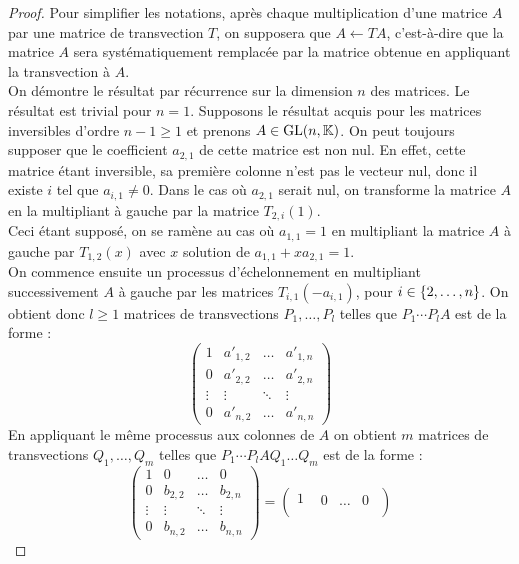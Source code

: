 \begin{proof}
Pour simplifier les notations, après chaque multiplication d'une matrice $A$ par une matrice de transvection $T$, on supposera que 
$A \longleftarrow T A$, 
c'est-à-dire que la matrice $A$ sera systématiquement remplacée par la matrice obtenue en appliquant la transvection à $A$. \\
 
On démontre le résultat par récurrence sur la dimension $n$ des matrices.
Le résultat est trivial pour $n=1$. Supposons le résultat acquis pour les matrices inversibles d'ordre $n-1 \geq 1$ et prenons $A \in \text{GL}(n,\mathbb{K})$.
On peut toujours supposer que le coefficient $a_{2,1}$ de cette matrice est non nul. En effet, cette matrice étant inversible, sa première
colonne n'est pas le vecteur nul, donc il existe $i$ tel que $a_{i,1} \neq 0$. 
Dans le cas où $a_{2,1}$ serait nul, on transforme la matrice $A$ en la multipliant à gauche par la matrice $T_{2,i}(1)$. \\
Ceci étant supposé, on se ramène au cas où $a_{1,1} = 1$ en multipliant la matrice $A$  à gauche par $T_{1,2}(x)$ 
avec $x$ solution de $a_{1,1} + x a_{2,1} = 1$. \\ 
On commence ensuite un processus d'échelonnement en multipliant successivement $A$ à gauche par les matrices $T_{i,1}(-a_{i,1})$,
pour $i \in \{ 2, \dots, n \}$.
On obtient donc $l \geq 1$ matrices de transvections $P_1, \dots, P_l$ telles que $P_1 \cdots P_l A$ est de la forme :
\[ \begin{pmatrix}
1 & a'_{1,2} & \dots & a'_{1,n} \\
0 & a'_{2,2} & \dots & a'_{2,n} \\
\vdots & \vdots & \ddots & \vdots \\
0 & a'_{n,2} & \dots & a'_{n,n}
\end{pmatrix} \]
En appliquant le même processus aux colonnes de $A$ on obtient $m$ matrices de transvections $Q_1, \dots, Q_m$ telles que
$P_1 \cdots P_l A Q_1 \dots Q_m$ est de la forme :
\[ \begin{pmatrix}
1 & 0 & \dots & 0 \\
0 & b_{2,2} & \dots & b_{2,n} \\
\vdots & \vdots & \ddots & \vdots \\
0 & b_{n,2} & \dots & b_{n,n}
\end{pmatrix} =
\begin{pmatrix} 
1 & \begin{matrix} 0 & \dots & 0 \end{matrix} \\

\end{pmatrix}\]
\end{proof}

